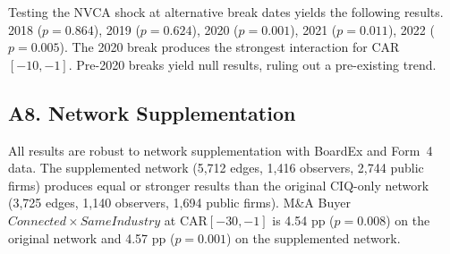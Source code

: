Testing the NVCA shock at alternative break dates yields the following results. 2018 ($p=0.864$), 2019 ($p=0.624$), 2020 ($p=0.001$), 2021 ($p=0.011$), 2022 ($p=0.005$). The 2020 break produces the strongest interaction for CAR$[-10,-1]$. Pre-2020 breaks yield null results, ruling out a pre-existing trend.

\subsection*{A8. Network Supplementation}

All results are robust to network supplementation with BoardEx and Form~4 data. The supplemented network (5,712 edges, 1,416 observers, 2,744 public firms) produces equal or stronger results than the original CIQ-only network (3,725 edges, 1,140 observers, 1,694 public firms). M\&A Buyer $Connected \times SameIndustry$ at CAR$[-30,-1]$ is 4.54 pp ($p=0.008$) on the original network and 4.57 pp ($p=0.001$) on the supplemented network.